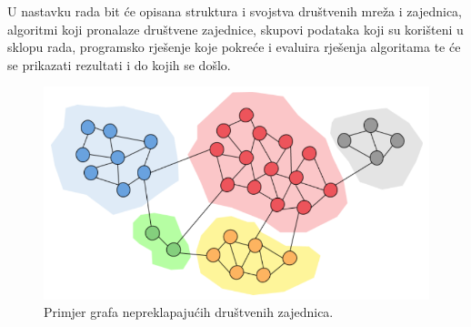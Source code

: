 U nastavku rada bit će opisana struktura i svojstva društvenih mreža i zajednica, algoritmi koji pronalaze društvene zajednice, skupovi podataka koji su korišteni u sklopu rada, programsko rješenje koje pokreće i evaluira rješenja algoritama te će se prikazati rezultati i do kojih se došlo. 


\begin{figure}
	\includegraphics[width=\linewidth]{images/simple-community.png}
	\caption{Primjer grafa nepreklapajućih društvenih zajednica.}
	\label{fig:comm1}
\end{figure}
